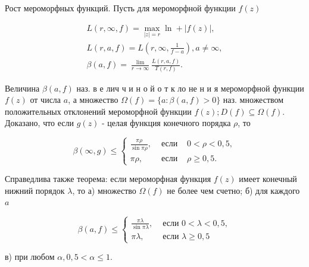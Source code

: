 \documentclass[10pt]{article}
\begin{document}
Рост мероморфных функций. Пусть для мероморфной функции $f(z)$



\[

\begin{gathered}

L(r, \infty, f)=\max _{|z|=r} \ln +|f(z)|, \\

L(r, a, f)=L\left(r, \infty, \frac{1}{f-a}\right), a \neq \infty, \\

\beta(a, f)=\frac{\lim }{r \rightarrow \infty} \frac{L(r, a, f)}{T(r, f)} .

\end{gathered}

\]



Величина $\beta(a, f)$ наз. в е лич ч и н о й о т к ло не н и я мероморфной функции $f(z)$ от числа $a$, а множество $\Omega(f)=\{a: \beta(a, f)>0\}$ наз. множеством положительных отклонений мероморфной функции $f(z) ; D(f) \subseteq \Omega(f)$. Доказано, что если $g(z)$ - целая функция конечного порядка $\rho$, то



\[

\beta(\infty, g) \leqslant\left\{\begin{array}{lll}

\frac{\pi \rho}{\sin \pi \rho}, & \text { если } & 0<\rho<0,5, \\

\pi \rho, & \text { если } & \rho \geqslant 0,5 .

\end{array}\right.

\]



Справедлива также теорема: если мероморфная функция $f(z)$ имеет конечный нижний порядок $\lambda$, то а) множество $\Omega(f)$ не более чем счетно; б) для каждого $a$



\[

\beta(a, f) \leqslant \begin{cases}\frac{\pi \lambda}{\sin \pi \lambda}, & \text { если } 0<\lambda<0,5, \\ \pi \lambda, & \text { если } \lambda \geqslant 0,5\end{cases}

\]



в) при любом $\alpha, 0,5<\alpha \leqslant 1$.
\end{document}
